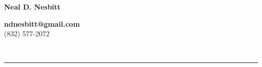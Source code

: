 \documentclass[10pt]{article}
\begin{document}
\noindent
\begin{minipage}[l]{0.58\textwidth}
    \color{Blue}\Huge \bf Neal D. Nesbitt
\end{minipage}
\hfill
\begin{minipage}[r]{0.38\textwidth}
    \raggedleft
    \textbf{ndnesbitt@gmail.com}\\
    (832) 577-2072
\end{minipage}\\

{\color{Orange}\hrule height 2pt width 0.75\textwidth}







\end{document}
